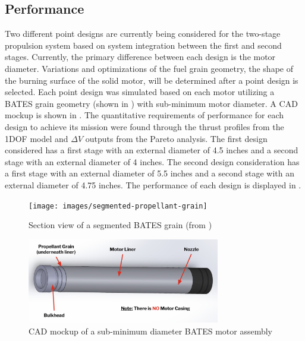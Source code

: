 \subsection{Performance}
Two different point designs are currently being considered for the two-stage propulsion system based on system integration between the first and second stages. Currently, the primary difference between each design is the motor diameter. Variations and optimizations of the fuel grain geometry, the shape of the burning surface of the solid motor, will be determined after a point design is selected. Each point design was simulated based on each motor utilizing a BATES grain geometry (shown in ) with sub-minimum motor diameter. A CAD mockup is shown in . The quantitative requirements of performance for each design to achieve its mission were found through the thrust profiles from the 1DOF model and \(\Delta V\) outputs from the Pareto analysis. The first design considered has a first stage with an external diameter of 4.5 inches and a second stage with an external diameter of 4 inches. The second design consideration has a first stage with an external diameter of 5.5 inches and a second stage with an external diameter of 4.75 inches. The performance of each design is displayed in .

\begin{figure}
    \centering
    \texttt{[image: images/segmented-propellant-grain]}
    \caption{Section view of a segmented BATES grain (from \cite{zeller})} %
    \label{figure:segmented-grain}
\end{figure}

\begin{figure}
    \centering
    \includegraphics[width=0.75\textwidth]{images/prop-cad}
    \caption{CAD mockup of a sub-minimum diameter BATES motor assembly}
    \label{figure:bates-cad}
\end{figure}

